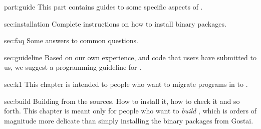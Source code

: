 
\begin{partDescription}{part:guide}
  {
    This part contains guides to some specific aspects of \usdk.
  }
\item[sec:installation]
  Complete instructions on how to install \usdk binary packages.
\item[sec:faq]
  Some answers to common questions.
\item[sec:guideline]
  Based on our own experience, and code that users have submitted to us, we
  suggest a programming guideline for \usdk.
\item[sec:k1] This chapter is intended to people who want to migrate
  programs in  to .
\item[sec:build] Building \usdk from the sources.  How to install it,
  how to check it and so forth.  This chapter is meant only for people who
  want to \emph{build} \usdk, which is orders of magnitude more delicate
  than simply installing the binary packages from Gostai.
\end{partDescription}

